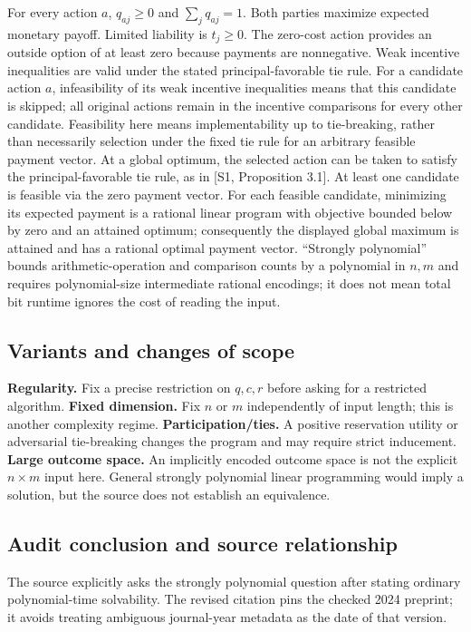 \documentclass[11pt,a4paper]{article}
\begin{document}
For every action $a$, $q_{aj}\geq0$ and $\sum_jq_{aj}=1$. Both parties maximize expected monetary payoff. Limited liability is $t_j\geq0$. The zero-cost action provides an outside option of at least zero because payments are nonnegative. Weak incentive inequalities are valid under the stated principal-favorable tie rule. For a candidate action $a$, infeasibility of its weak incentive inequalities means that this candidate is skipped; all original actions remain in the incentive comparisons for every other candidate. Feasibility here means implementability up to tie-breaking, rather than necessarily selection under the fixed tie rule for an arbitrary feasible payment vector. At a global optimum, the selected action can be taken to satisfy the principal-favorable tie rule, as in [S1, Proposition 3.1]. At least one candidate is feasible via the zero payment vector. For each feasible candidate, minimizing its expected payment is a rational linear program with objective bounded below by zero and an attained optimum; consequently the displayed global maximum is attained and has a rational optimal payment vector. ``Strongly polynomial'' bounds arithmetic-operation and comparison counts by a polynomial in $n,m$ and requires polynomial-size intermediate rational encodings; it does not mean total bit runtime ignores the cost of reading the input.

\subsection*{Variants and changes of scope}

\textbf{Regularity.} Fix a precise restriction on $q,c,r$ before asking for a restricted algorithm. \textbf{Fixed dimension.} Fix $n$ or $m$ independently of input length; this is another complexity regime. \textbf{Participation/ties.} A positive reservation utility or adversarial tie-breaking changes the program and may require strict inducement. \textbf{Large outcome space.} An implicitly encoded outcome space is not the explicit $n\times m$ input here. General strongly polynomial linear programming would imply a solution, but the source does not establish an equivalence.

\subsection*{Audit conclusion and source relationship}

The source explicitly asks the strongly polynomial question after stating ordinary polynomial-time solvability. The revised citation pins the checked 2024 preprint; it avoids treating ambiguous journal-year metadata as the date of that version.
\end{document}
